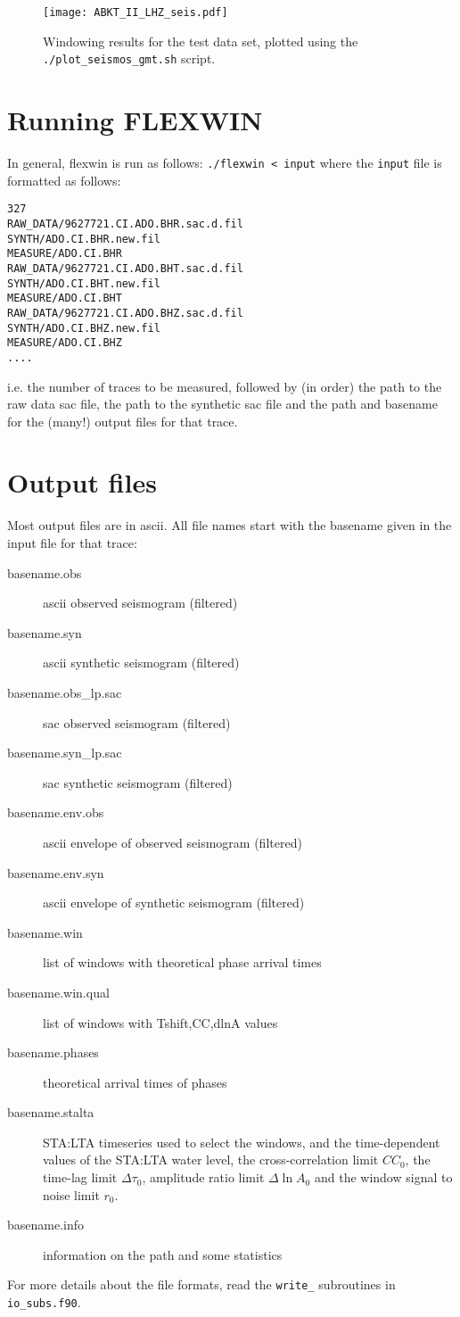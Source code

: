 \begin{figure}
\center \texttt{[image: ABKT\_II\_LHZ\_seis.pdf]}
\caption{\label{fg:test_data}
Windowing results for the test data set, plotted using the {\tt ./plot\_seismos\_gmt.sh} script.
}
\end{figure}


\section{Running FLEXWIN}

In general, flexwin is run as follows: {\tt ./flexwin < input} where the {\tt input} file is formatted as follows:
{\small
\begin{verbatim}
327
RAW_DATA/9627721.CI.ADO.BHR.sac.d.fil
SYNTH/ADO.CI.BHR.new.fil
MEASURE/ADO.CI.BHR
RAW_DATA/9627721.CI.ADO.BHT.sac.d.fil
SYNTH/ADO.CI.BHT.new.fil
MEASURE/ADO.CI.BHT
RAW_DATA/9627721.CI.ADO.BHZ.sac.d.fil
SYNTH/ADO.CI.BHZ.new.fil
MEASURE/ADO.CI.BHZ
....
\end{verbatim}
}

i.e. the number of traces to be measured, followed by (in order) the path to
the raw data sac file, the path to the synthetic sac file and the path and
basename for the (many!) output files for that trace. 

\section{Output files}
Most output files are in ascii.  All file names start with the basename given
in the input file for that trace:
\begin{description}
\item[basename.obs]	ascii observed seismogram (filtered) 
\item[basename.syn]	ascii synthetic seismogram (filtered)
\item[basename.obs\_lp.sac] sac observed seismogram (filtered)
\item[basename.syn\_lp.sac] sac synthetic seismogram (filtered)
\item[basename.env.obs]	ascii envelope of observed seismogram (filtered)
\item[basename.env.syn]	ascii envelope of synthetic seismogram (filtered)
\item[basename.win]		list of windows with theoretical phase arrival times
\item[basename.win.qual]	list of windows with Tshift,CC,dlnA values 
\item[basename.phases]		theoretical arrival times of phases
\item[basename.stalta]		STA:LTA timeseries used to select the windows, and
the time-dependent values of the STA:LTA water level, the cross-correlation
limit $CC_0$, the time-lag limit $\Delta\tau_0$, amplitude ratio limit
$\Delta\ln{A}_0$ and the window signal to noise limit $r_0$.
\item[basename.info]	information on the path and some statistics
\end{description}
For more details about the file formats, read the {\tt write\_}
subroutines in {\tt io\_subs.f90}.

